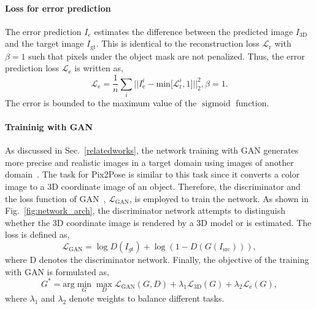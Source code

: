 \documentclass[10pt,twocolumn,letterpaper]{article}
\begin{document}
\paragraph{Loss for error prediction}
The error prediction $I_e$ estimates the difference between the predicted image $I_\textrm{3D}$ and the target image $I_\textrm{gt}$. This is identical to the reconstruction loss $\mathcal{L}_\textrm{r}$ with $\beta=1$ such that pixels under the object mask are not penalized. Thus, the error prediction loss $\mathcal{L}_\textrm{e}$ is written as, 
\begin{equation} \label{eq:error_loss}    
\mathcal{L}_\textrm{e} =\frac{1}{n} \sum_{i}||I_\textrm{e}^{i} - \textrm{min}\big[\mathcal{L}_\textrm{r}^{i},1\big]||^2_2, \beta = 1.
\end{equation} 
The error is bounded to the maximum value of the $\operatorname{sigmoid}$ function.


\paragraph{Traininig with GAN} As discussed in Sec.~\ref{relatedworks}, the network training with GAN generates more precise and realistic images in a target domain using images of another domain~\cite{Isola_2017_CVPR_pix2pix}. The task for Pix2Pose is similar to this task since it converts a color image to a 3D coordinate image of an object. Therefore, the discriminator and the loss function of GAN~\cite{goodfellow2014generative}, $\mathcal{L}_{\textrm{GAN}}$, is employed to train the network. As shown in Fig.~\ref{fig:network_arch}, the discriminator network attempts to distinguish whether the 3D coordinate image is rendered by a 3D model or is estimated. The loss is defined as, 
\begin{equation} \label{eq:gan_loss}    
\mathcal{L}_{\textrm{GAN}} = \log D(I_{gt}) + \log (1-D(G(I_\textrm{src}))),
\end{equation}
where D denotes the discriminator network. Finally, the objective of the training with GAN is formulated as, 
\begin{equation} \label{eq:loss_all}    
G^* = \textrm{arg}\min_{G} \max_{D}  \mathcal{L}_\textrm{GAN} (G,D) + \lambda_1 \mathcal{L}_\textrm{3D} (G) + \lambda_2 \mathcal{L}_\textrm{e}(G),
\end{equation} 
where $\lambda_1$ and $\lambda_2$ denote weights to balance different tasks. 
\end{document}
